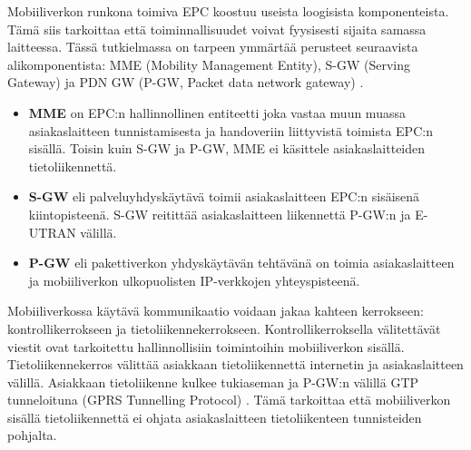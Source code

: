 Mobiiliverkon runkona toimiva EPC koostuu useista loogisista komponenteista.
Tämä siis tarkoittaa että toiminnallisuudet voivat fyysisesti sijaita samassa laitteessa. 
Tässä tutkielmassa on tarpeen ymmärtää perusteet seuraavista alikomponentista: MME (Mobility Management Entity), S-GW (Serving Gateway) ja PDN GW (P-GW, Packet data network gateway) \cite{etsilte}.
\begin{itemize}
\item \textbf{MME} on EPC:n hallinnollinen entiteetti joka vastaa muun muassa asiakaslaitteen tunnistamisesta ja handoveriin liittyvistä toimista EPC:n sisällä. Toisin kuin S-GW ja P-GW, MME ei käsittele asiakaslaitteiden tietoliikennettä.
\item \textbf{S-GW} eli palveluyhdyskäytävä toimii asiakaslaitteen EPC:n sisäisenä kiintopisteenä.  S-GW reitittää asiakaslaitteen liikennettä P-GW:n ja E-UTRAN välillä.
\item \textbf{P-GW} eli pakettiverkon yhdyskäytävän tehtävänä on toimia asiakaslaitteen ja mobiiliverkon ulkopuolisten IP-verkkojen yhteyspisteenä.
\end{itemize}
\cite{3gppepc}

Mobiiliverkossa käytävä kommunikaatio voidaan jakaa kahteen kerrokseen: kontrollikerrokseen ja tietoliikennekerrokseen.
Kontrollikerroksella välitettävät viestit ovat tarkoitettu hallinnollisiin toimintoihin mobiiliverkon sisällä. 
Tietoliikennekerros välittää asiakkaan tietoliikennettä internetin ja asiakaslaitteen välillä.
Asiakkaan tietoliikenne kulkee tukiaseman ja P-GW:n välillä GTP tunneloituna (GPRS Tunnelling Protocol) \cite{puente15seamless}. Tämä tarkoittaa että mobiiliverkon sisällä tietoliikennettä ei ohjata asiakaslaitteen tietoliikenteen tunnisteiden pohjalta. 
